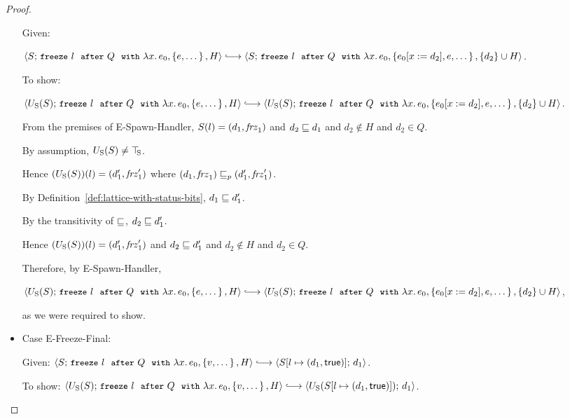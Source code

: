 \begin{proof}
\begin{itemize}
    Given:

    $\config{S}{\freezeafterfull{l}{Q}{\lam{x}{e_0}}{\setof{e,
          \dots}}{H}} \parstepsto
    \\ \config{S}{\freezeafterfull{l}{Q}{\lam{x}{e_0}}{\setof{\subst{e_0}{x}{d_2},
          e, \dots}} {\{d_2\}\cup H}}$.

    To show:

    $\config{\Ustore(S)}{\freezeafterfull{l}{Q}{\lam{x}{e_0}}{\setof{e,
          \dots}}{H}} \parstepsto
    \\ \config{\Ustore(S)}{\freezeafterfull{l}{Q}{\lam{x}{e_0}}{\setof{\subst{e_0}{x}{d_2},
          e, \dots}} {\{d_2\}\cup H}}$.

    From the premises of {\sc E-Spawn-Handler}, $S(l) =
    (d_1, \mathit{frz}_1)$ and $d_2 \sqsubseteq d_1$ and $d_2 \notin H$
    and $d_2 \in Q$.

    By assumption, $U_{\mathrm{S}}(S) \neq \top\hspace{-0.85mm}_{\mathrm{S}}$.

    Hence $(U_{\mathrm{S}}(S))(l) = (d'_1, \mathit{frz}'_1)$ where
    $(d_1, \mathit{frz}_1) \sqsubseteq_p (d'_1, \mathit{frz}'_1)$.

    By Definition~\ref{def:lattice-with-status-bits}, $d_1 \sqsubseteq
    d'_1$.

    By the transitivity of $\sqsubseteq$, $d_2 \sqsubseteq d'_1$.

    Hence $(U_{\mathrm{S}}(S))(l) = (d'_1, \mathit{frz}'_1)$ and $d_2 \sqsubseteq
    d'_1$ and $d_2 \notin H$ and $d_2 \in Q$.

    Therefore, by {\sc E-Spawn-Handler},

    $\config{\Ustore(S)}{\freezeafterfull{l}{Q}{\lam{x}{e_0}}{\setof{e,
          \dots}}{H}} \parstepsto
    \\ \config{\Ustore(S)}{\freezeafterfull{l}{Q}{\lam{x}{e_0}}{\setof{\subst{e_0}{x}{d_2},
          e, \dots}} {\{d_2\}\cup H}}$,

    as we were required to show.

  \item Case {\sc E-Freeze-Final}:

    Given: $\config{S}{\freezeafterfull{l}{Q}{\lam{x}{e_0}}{\setof{v,
          \dots}}{H}} \parstepsto
    \\ \config{\extS{S}{l}{d_1}{\frozentrue}}{d_1}$.

    To show:
    $\config{\Ustore(S)}{\freezeafterfull{l}{Q}{\lam{x}{e_0}}{\setof{v,
          \dots}}{H}} \parstepsto
    \\ \config{\Ustore(\extS{S}{l}{d_1}{\frozentrue})}{d_1}$.


\end{itemize}
\end{proof}
